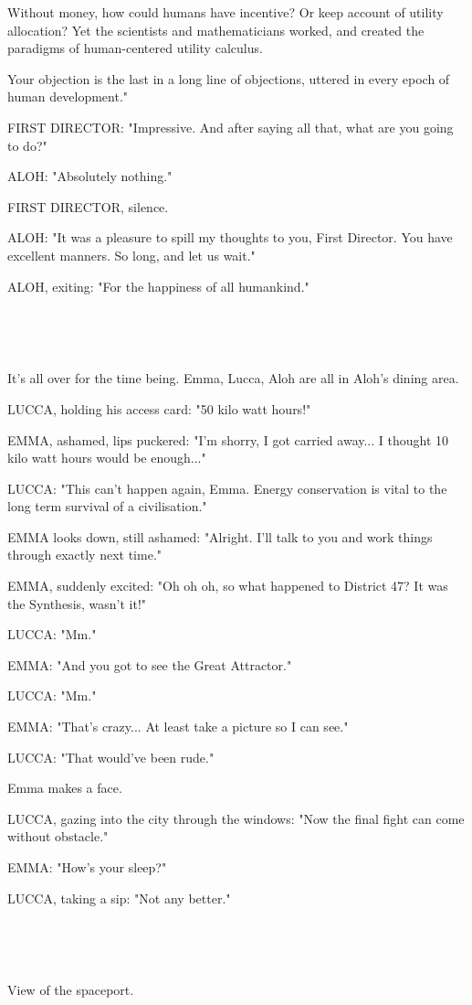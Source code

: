 \documentclass[11pt]{article}
\begin{document}
Without money, how could humans have incentive? Or keep account of utility allocation? 
Yet the scientists and mathematicians worked, and created the paradigms of human-centered utility calculus.

Your objection is the last in a long line of objections, uttered in every epoch of human development."

FIRST DIRECTOR: "Impressive. And after saying all that, what are you going to do?"

ALOH: "Absolutely nothing."

FIRST DIRECTOR, silence.

ALOH: "It was a pleasure to spill my thoughts to you, First Director.
You have excellent manners.
So long, and let us wait."

ALOH, exiting: "For the happiness of all humankind."

\ 

\ 

It's all over for the time being.
Emma, Lucca, Aloh are all in Aloh's dining area.

LUCCA, holding his access card: "50 kilo watt hours!"

EMMA, ashamed, lips puckered: "I'm shorry, I got carried away...
I thought 10 kilo watt hours would be enough..."

LUCCA: "This can't happen again, Emma.
Energy conservation is vital to the long term survival of a civilisation."

EMMA looks down, still ashamed: "Alright. I'll talk to you and work things through exactly next time."

EMMA, suddenly excited: "Oh oh oh, so what happened to District 47?
It was the Synthesis, wasn't it!"

LUCCA: "Mm."

EMMA: "And you got to see the Great Attractor."

LUCCA: "Mm."

EMMA: "That's crazy...
At least take a picture so I can see."

LUCCA: "That would've been rude."

Emma makes a face.

LUCCA, gazing into the city through the windows: "Now the final fight can come without obstacle."

EMMA: "How's your sleep?"

LUCCA, taking a sip: "Not any better."

\ 

\ 

View of the spaceport.
\end{document}
